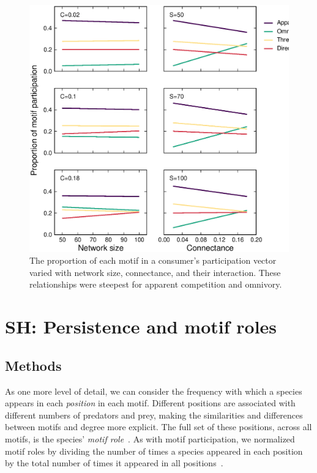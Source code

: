 \documentclass[12pt]{article}
\begin{document}
\begin{spacing}{2.0}
    \begin{figure}[h!]
        \centering
        \includegraphics[height=.65\textheight]{figures/participation_vs_SC.eps}
        \caption{The proportion of each motif in a consumer's participation vector varied with network size, connectance, and their interaction. These relationships were steepest for apparent competition and omnivory.}
        \label{fig:roles_vs_SC}
    \end{figure}
\clearpage 

\section{SH: Persistence and motif roles}

    \subsection*{Methods}

        As one more level of detail, we can consider the frequency with which a species appears in each \emph{position} in each motif. 
        Different positions are associated with different numbers of predators and prey, making the similarities and differences between motifs and degree more explicit.
        The full set of these positions, across all motifs, is the species' \emph{motif role}~\citep{Stouffer2010,Cirtwill2017}.
        As with motif participation, we normalized motif roles by dividing the number of times a species appeared in each position by the total number of times it appeared in all positions~\citep{Baker2015,Cirtwill2017}.
        

\end{spacing}
\end{document}
